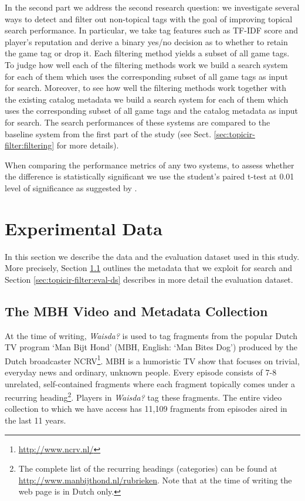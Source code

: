 In the second part we address the second research question: we investigate several ways to detect and filter out non-topical tags with the goal of improving topical search performance. In particular, we take tag features such as TF-IDF score and player's reputation and derive a binary yes/no decision as to whether to retain the game tag or drop it. Each filtering method yields a subset of all game tags. To judge how well each of the filtering methods work we build a search system for each of them which uses the corresponding subset of all game tags as input for search. Moreover, to see how well the filtering methods work together with the existing catalog metadata we build a search system for each of them which uses the corresponding subset of all game tags and the catalog metadata as input for search. The search performances of these systems are compared to the baseline system from the first part of the study (see Sect. \ref{sec:topicir-filter:filtering} for more details).

When comparing the performance metrics of any two systems, to assess whether the difference is statistically significant we use the student's paired t-test at 0.01 level of significance as suggested by \cite{stat-sig}.

\section{Experimental Data}
In this section we describe the data and the evaluation dataset used in this study. More precisely, Section \ref{sec:topicir-filter:video-metadata-collection} outlines the metadata that we exploit for search and Section \ref{sec:topicir-filter:eval-ds} describes in more detail the evaluation dataset.

\subsection{The MBH Video and Metadata Collection}\label{sec:topicir-filter:video-metadata-collection}
At the time of writing, \textit{Waisda?} is used to %
tag fragments from the popular Dutch TV program `Man Bijt Hond' (MBH, English: `Man Bites Dog') produced by the Dutch broadcaster NCRV\footnote{\url{http://www.ncrv.nl/}}.  MBH is a humoristic TV show that focuses on trivial, everyday news and ordinary, unknown people.  Every episode consists of 7-8 unrelated, self-contained fragments where each fragment topically comes under a recurring heading\footnote{The complete list of the recurring headings (categories) can be found at \url{http://www.manbijthond.nl/rubrieken}. Note that at the time of writing the web page is in Dutch only.}. Players in \textit{Waisda?} tag these fragments.  The entire video collection to which we have access has 11,109 fragments from episodes aired in the last 11 years.


